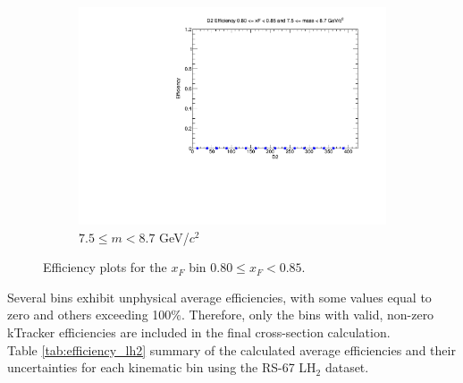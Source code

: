 \documentclass[11pt]{article}
\begin{document}
\begin{figure}[p]
\begin{subfigure}[b]{0.32\textwidth}
        \includegraphics[width=\textwidth]{./kTrackerEfficiencyPlots/D2_Efficiency_xF16_mass10.pdf}
        \caption{$7.5 \leq m < 8.7$ GeV/$c^2$}
    \end{subfigure}
    \caption{Efficiency plots for the $x_F$ bin $0.80 \leq x_F < 0.85$.}
\end{figure}

\clearpage
\FloatBarrier
Several bins exhibit unphysical average efficiencies, with some values equal to zero and others exceeding 100\%. Therefore, only the bins with valid, non-zero kTracker efficiencies are included in the final cross-section calculation.
\\

Table \ref{tab:efficiency_lh2} summary of the calculated average efficiencies and their uncertainties for each kinematic bin using the RS-67 LH$_2$ dataset.
\end{document}
